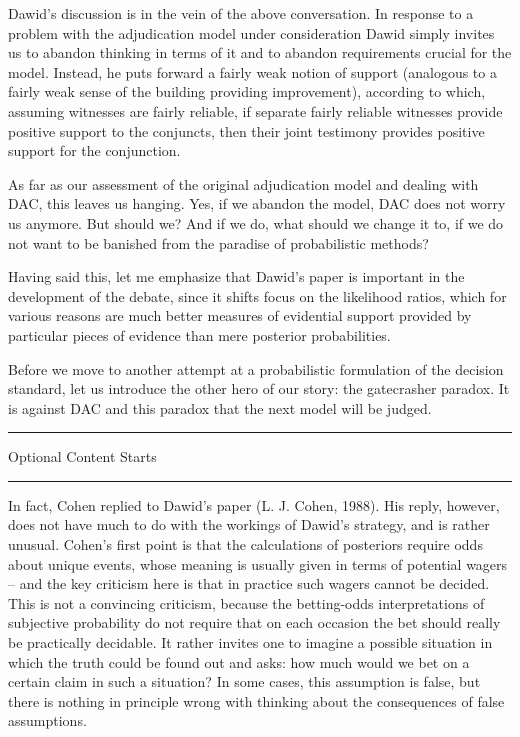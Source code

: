 \documentclass[10pt,dvipsnames,enabledeprecatedfontcommands]{scrartcl}
\newcommand{\intermezzoa}{
	\begin{minipage}[c]{13cm}
	\begin{center}\rule{10cm}{0.4pt}



	\tiny{\sc Optional Content Starts}
	
	\vspace{-1mm}
	
	\rule{10cm}{0.4pt}\end{center}
	\end{minipage}\nopagebreak 
	}
\begin{document}
\vspace{1mm}

Dawid's discussion is in the vein of the above conversation. In response
to a problem with the adjudication model under consideration Dawid
simply invites us to abandon thinking in terms of it and to abandon
requirements crucial for the model. Instead, he puts forward a fairly
weak notion of support (analogous to a fairly weak sense of the building
providing improvement), according to which, assuming witnesses are
fairly reliable, if separate fairly reliable witnesses provide positive
support to the conjuncts, then their joint testimony provides positive
support for the conjunction.

As far as our assessment of the original adjudication model and dealing
with DAC, this leaves us hanging. Yes, if we abandon the model, DAC does
not worry us anymore. But should we? And if we do, what should we change
it to, if we do not want to be banished from the paradise of
probabilistic methods?

Having said this, let me emphasize that Dawid's paper is important in
the development of the debate, since it shifts focus on the likelihood
ratios, which for various reasons are much better measures of evidential
support provided by particular pieces of evidence than mere posterior
probabilities.

Before we move to another attempt at a probabilistic formulation of the
decision standard, let us introduce the other hero of our story: the
gatecrasher paradox. It is against DAC and this paradox that the next
model will be judged.

\intermezzoa

In fact, Cohen replied to Dawid's paper (L. J. Cohen, 1988). His reply,
however, does not have much to do with the workings of Dawid's strategy,
and is rather unusual. Cohen's first point is that the calculations of
posteriors require odds about unique events, whose meaning is usually
given in terms of potential wagers -- and the key criticism here is that
in practice such wagers cannot be decided. This is not a convincing
criticism, because the betting-odds interpretations of subjective
probability do not require that on each occasion the bet should really
be practically decidable. It rather invites one to imagine a possible
situation in which the truth could be found out and asks: how much would
we bet on a certain claim in such a situation? In some cases, this
assumption is false, but there is nothing in principle wrong with
thinking about the consequences of false assumptions.
\end{document}
